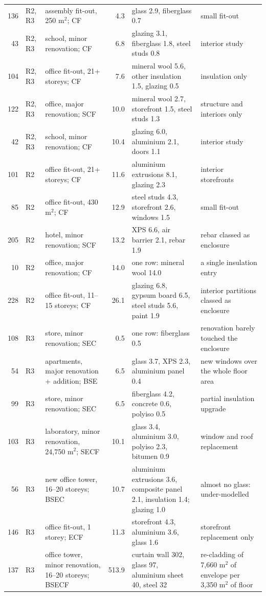 \documentclass[10pt,letterpaper]{article}
\begin{document}
\begin{table}[p]
\begin{tabular}{rlp{}rp{}p{}}
136 & R2, R3 & assembly fit-out, 250 m$^2$; CF & 4.3 & glass 2.9, fiberglass 0.7 & small fit-out \\
43 & R2, R3 & school, minor renovation; CF & 6.8 & glazing 3.1, fiberglass 1.8, steel studs 0.8 & interior study \\
104 & R2, R3 & office fit-out, 21+ storeys; CF & 7.6 & mineral wool 5.6, other insulation 1.5, glazing 0.5 & insulation only \\
122 & R2, R3 & office, major renovation; SCF & 10.0 & mineral wool 2.7, storefront 1.5, steel studs 1.3 & structure and interiors only \\
42 & R2, R3 & school, minor renovation; CF & 10.4 & glazing 6.0, aluminium 2.1, doors 1.1 & interior study \\
101 & R2 & office fit-out, 21+ storeys; CF & 11.6 & aluminium extrusions 8.1, glazing 2.3 & interior storefronts \\
85 & R2 & office fit-out, 430 m$^2$; CF & 12.9 & steel studs 4.3, storefront 2.6, windows 1.5 & small fit-out \\
205 & R2 & hotel, minor renovation; SCF & 13.2 & XPS 6.6, air barrier 2.1, rebar 1.9 & rebar classed as enclosure \\
10 & R2 & office, major renovation; CF & 14.0 & one row: mineral wool 14.0 & a single insulation entry \\
228 & R2 & office fit-out, 11--15 storeys; CF & 26.1 & glazing 6.8, gypsum board 6.5, steel studs 5.6, paint 1.9 & interior partitions classed as enclosure \\
\midrule
108 & R3 & store, minor renovation; SEC & 0.5 & one row: fiberglass 0.5 & renovation barely touched the enclosure \\
54 & R3 & apartments, major renovation + addition; BSE & 6.5 & glass 3.7, XPS 2.3, aluminium panel 0.4 & new windows over the whole floor area \\
99 & R3 & store, minor renovation; SEC & 6.5 & fiberglass 4.2, concrete 0.6, polyiso 0.5 & partial insulation upgrade \\
103 & R3 & laboratory, minor renovation, 24{,}750 m$^2$; SECF & 10.1 & glass 3.4, aluminium 3.0, polyiso 2.3, bitumen 0.9 & window and roof replacement \\
56 & R3 & new office tower, 16--20 storeys; BSEC & 10.7 & aluminium extrusions 3.6, composite panel 2.1, insulation 1.4; glazing 1.0 & almost no glass: under-modelled \\
146 & R3 & office fit-out, 1 storey; ECF & 11.3 & storefront 4.3, aluminium 3.6, glass 1.6 & storefront replacement only \\
137 & R3 & office tower, minor renovation, 16--20 storeys; BSECF & 513.9 & curtain wall 302, glass 97, aluminium sheet 40, steel 32 & re-cladding of 7{,}660 m$^2$ of envelope per 3{,}350 m$^2$ of floor \\
\bottomrule
\end{tabular}
\end{table}
\end{document}
